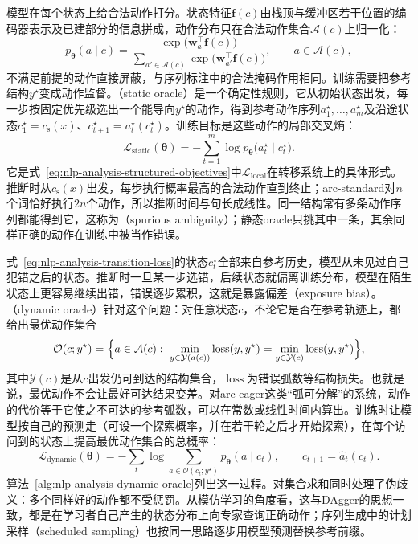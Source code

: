 模型在每个状态上给合法动作打分。状态特征$\bm f(c)$由栈顶与缓冲区若干位置的编码器表示及已建部分的信息拼成，动作分布只在合法动作集合$\mathcal A(c)$上归一化：
\[
  p_{\bm\theta}(a\mid c)=\frac{\exp\bigl(\bm w_a^\top\bm f(c)\bigr)}{\sum_{a'\in\mathcal A(c)}\exp\bigl(\bm w_{a'}^\top\bm f(c)\bigr)},\qquad a\in\mathcal A(c),
\]
不满足前提的动作直接屏蔽，与序列标注中的合法掩码作用相同。训练需要把参考结构$y^\star$变成动作监督。（static oracle）是一个确定性规则，它从初始状态出发，每一步按固定优先级选出一个能导向$y^\star$的动作，得到参考动作序列$a_1^\star,\ldots,a_m^\star$及沿途状态$c_1^\star=c_{\mathrm s}(x)$、$c_{t+1}^\star=a_t^\star(c_t^\star)$。训练目标是这些动作的局部交叉熵：
\begin{equation}
  \mathcal L_{\mathrm{static}}(\bm\theta)=-\sum_{t=1}^{m}\log p_{\bm\theta}\bigl(a_t^\star\mid c_t^\star\bigr).
  \label{eq:nlp-analysis-transition-loss}
\end{equation}
它是式~\eqref{eq:nlp-analysis-structured-objectives}中$\mathcal L_{\mathrm{local}}$在转移系统上的具体形式。推断时从$c_{\mathrm s}(x)$出发，每步执行概率最高的合法动作直到终止；arc-standard对$n$个词恰好执行$2n$个动作，所以推断时间与句长成线性。同一结构常有多条动作序列都能得到它，这称为（spurious ambiguity）；静态oracle只挑其中一条，其余同样正确的动作在训练中被当作错误。

式~\eqref{eq:nlp-analysis-transition-loss}的状态$c_t^\star$全部来自参考历史，模型从未见过自己犯错之后的状态。推断时一旦某一步选错，后续状态就偏离训练分布，模型在陌生状态上更容易继续出错，错误逐步累积，这就是暴露偏差（exposure bias）。（dynamic oracle）针对这个问题：对任意状态$c$，不论它是否在参考轨迹上，都给出最优动作集合
\[
  \mathcal O(c;y^\star)=\Bigl\{a\in\mathcal A(c):\ \min_{y\in\mathcal Y(a(c))}\operatorname{loss}(y,y^\star)=\min_{y\in\mathcal Y(c)}\operatorname{loss}(y,y^\star)\Bigr\},
\]
其中$\mathcal Y(c)$是从$c$出发仍可到达的结构集合，$\operatorname{loss}$为错误弧数等结构损失。也就是说，最优动作不会让最好可达结果变差。对arc-eager这类“弧可分解”的系统，动作的代价等于它使之不可达的参考弧数，可以在常数或线性时间内算出。训练时让模型按自己的预测走（可设一个探索概率，并在若干轮之后才开始探索），在每个访问到的状态上提高最优动作集合的总概率：
\begin{equation}
  \mathcal L_{\mathrm{dynamic}}(\bm\theta)=-\sum_{t}\log\sum_{a\in\mathcal O(c_t;y^\star)}p_{\bm\theta}(a\mid c_t),\qquad c_{t+1}=\hat a_t(c_t).
  \label{eq:nlp-analysis-dynamic-oracle-loss}
\end{equation}
算法~\ref{alg:nlp-analysis-dynamic-oracle}列出这一过程。对集合求和同时处理了伪歧义：多个同样好的动作都不受惩罚。从模仿学习的角度看，这与DAgger的思想一致，都是在学习者自己产生的状态分布上向专家查询正确动作；序列生成中的计划采样（scheduled sampling）也按同一思路逐步用模型预测替换参考前缀。

